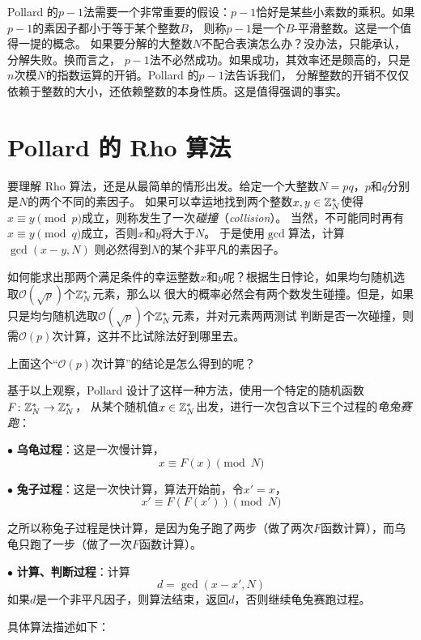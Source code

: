 Pollard 的$p - 1$法需要一个非常重要的假设：$p - 1$恰好是某些小素数的乘积。如果$p - 1$的素因子都小于等于某个整数$B$，
则称$p - 1$是一个$B$-平滑整数。这是一个值得一提的概念。
如果要分解的大整数$N$不配合表演怎么办？没办法，只能承认，分解失败。换而言之，
$p - 1$法不必然成功。如果成功，其效率还是颇高的，只是$n$次模$N$的指数运算的开销。Pollard 的$p - 1$法告诉我们，
分解整数的开销不仅仅依赖于整数的大小，还依赖整数的本身性质。这是值得强调的事实。

\section{Pollard 的 Rho 算法}
\label{sec:pol_rho}
要理解 Rho 算法，还是从最简单的情形出发。给定一个大整数$N = pq$，$p$和$q$分别是$N$的两个不同的素因子。
如果可以幸运地找到两个整数$x,y \in {\mathbb Z}_N^*$使得$x \equiv y \pmod{p}$成立，则称发生了一次\emph{碰撞}（\emph{collision}）。
当然，不可能同时再有$x \equiv y \pmod q$成立，否则$x$和$y$将大于$N$。
于是使用$\gcd$算法，计算$\gcd(x - y, N)$
则必然得到$N$的某个非平凡的素因子。

如何能求出那两个满足条件的幸运整数$x$和$y$呢？根据生日悖论，如果均匀随机选取$\mathcal{O}(\sqrt{p})$个${\mathbb Z}_N^*$元素，那么以
很大的概率必然会有两个数发生碰撞。但是，如果只是均匀随机选取$\mathcal{O}(\sqrt{p})$个${\mathbb Z}_N^*$元素，并对元素两两测试
判断是否一次碰撞，则需$\mathcal{O}(p)$次计算，这并不比试除法好到哪里去。%

\begin{thinking}
上面这个“$\mathcal{O}(p)$次计算”的结论是怎么得到的呢？
\end{thinking}

基于以上观察，Pollard 设计了这样一种方法，使用一个特定的随机函数$F\colon {\mathbb Z}_N^* \to {\mathbb Z}_N^*$，
从某个随机值$x\in {\mathbb Z}_N^*$出发，进行一次包含以下三个过程的\emph{龟兔赛跑}：

\noindent $\bullet$ \textbf{乌龟过程}：这是一次慢计算，
\[x \equiv  F(x) \pmod N\]

\noindent $\bullet$ \textbf{兔子过程}：这是一次快计算，算法开始前，令$x' = x$，
\[x' \equiv  F(F(x')) \pmod N\]

\noindent 之所以称兔子过程是快计算，是因为兔子跑了两步（做了两次$F$函数计算），而乌龟只跑了一步（做了一次$F$函数计算）。 

\noindent $\bullet$ \textbf{计算、判断过程}：计算
\[d = \gcd(x - x', N) \]
如果$d$是一个非平凡因子，则算法结束，返回$d$，否则继续龟兔赛跑过程。

具体算法描述如下：
\begin{center}
	
\end{center}


